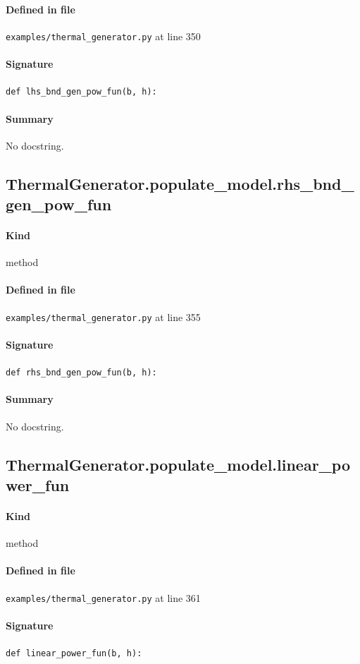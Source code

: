 \documentclass[11pt]{report}
\begin{document}
\paragraph{Defined in file} \texttt{examples/thermal\_generator.py} at line 350
\paragraph{Signature} \texttt{def lhs\_bnd\_gen\_pow\_fun(b, h):}
\paragraph{Summary} No docstring.
\subsection{ThermalGenerator.populate\_model.rhs\_bnd\_gen\_pow\_fun}
\label{def:examples-thermal_generator.py:ThermalGenerator.populate_model.rhs_bnd_gen_pow_fun:L355}
\paragraph{Kind} method
\paragraph{Defined in file} \texttt{examples/thermal\_generator.py} at line 355
\paragraph{Signature} \texttt{def rhs\_bnd\_gen\_pow\_fun(b, h):}
\paragraph{Summary} No docstring.
\subsection{ThermalGenerator.populate\_model.linear\_power\_fun}
\label{def:examples-thermal_generator.py:ThermalGenerator.populate_model.linear_power_fun:L361}
\paragraph{Kind} method
\paragraph{Defined in file} \texttt{examples/thermal\_generator.py} at line 361
\paragraph{Signature} \texttt{def linear\_power\_fun(b, h):}
\end{document}
